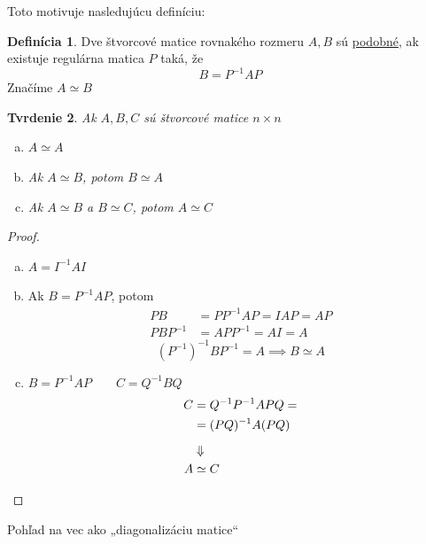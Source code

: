 \documentclass[11pt,a4paper]{article}
\theoremstyle{definition}
\newtheorem{definicia}{Definícia}[section]
\theoremstyle{plain}
\newtheorem{tvrdenie}[definicia]{Tvrdenie}
\theoremstyle{remark}
\begin{document}
\vspace{0.3cm}
Toto motivuje nasledujúcu definíciu:

\begin{definicia}
Dve štvorcové matice rovnakého rozmeru $A, B$ sú \ul{podobné}, ak existuje regulárna matica $P$ taká, že
\[ B = P^{-1} A P \]
Značíme $A \simeq B$
\end{definicia}

\begin{tvrdenie}
Ak $A, B, C$ sú štvorcové matice $n \times n$
\begin{enumerate}[a)]
    \item $A \simeq A$
    \item Ak $A \simeq B$, potom $B \simeq A$
    \item Ak $A \simeq B$ a $B \simeq C$, potom $A \simeq C$
\end{enumerate}
\end{tvrdenie}

\begin{proof}
\hfill
\begin{enumerate}[a)]
    \item $A = I^{-1} A I$
    \item Ak $B = P^{-1} A P$, potom
    \begin{align*}
    P B &= P P^{-1} A P = I A P = A P \\
    P B P^{-1} &= A P P^{-1} = A I = A
    \end{align*}
    \[ (P^{-1})^{-1} B P^{-1} = A \implies B \simeq A \]
    \item $B = P^{-1} A P \qquad C = Q^{-1} B Q$
    \begin{align*}
    C &= Q^{-1} P^{-1} A P Q = \\
    &= (P Q)^{-1} A (P Q) \\[0.2cm]
    &\Downarrow \\
    A &\simeq C \qedhere
    \end{align*}
\end{enumerate}
\end{proof}

\vspace{0.5cm}
\noindent Pohľad na vec ako „diagonalizáciu matice“
\end{document}
